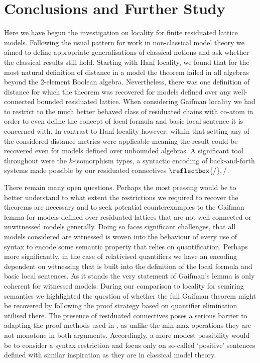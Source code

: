\documentclass{lmcs} %
\newcommand{\?}{\ensuremath{\mkern0.4\thinmuskip}}
\newcommand{\und}{\mathord{\reflectbox{/}}}%
\begin{document}

\section{Conclusions and Further Study}\label{Conclusion}
Here we have begun the investigation on locality for finite residuated lattice models. Following the usual pattern for work in non-classical model theory we aimed to define appropriate generalisations of classical notions and ask whether the classical results still hold. Starting with Hanf locality, we found that for the most natural definition of distance in a model the theorem failed in all algebras beyond the 2-element Boolean algebra. Nevertheless, there was one definition of distance for which the theorem was recovered for models defined over any well-connected bounded residuated lattice. When considering Gaifman locality we had to restrict to the much better behaved class of residuated chains with co-atom in order to even define the concept of local formula and basic local sentence it is concerned with. In contrast to Hanf locality however, within that setting any of the considered distance metrics were applicable meaning the result could be recovered even for models defined over unbounded algebras. A significant tool throughout were the $k$-isomorphism types, a syntactic encoding of back-and-forth systems made possible by our residuated connectives $\und,/$.

There remain many open questions. Perhaps the most pressing would be to better understand to what extent the restrictions we required to recover the theorems are necessary and to seek potential counterexamples to the Gaifman lemma for models defined over residuated lattices that are not well-connected or unwitnessed models generally. Doing so faces significant challenges, that all models considered are witnessed is woven into the behaviour of every use of syntax to encode some semantic property that relies on quantification. Perhaps more significantly, in the case of relativised quantifiers we have an encoding dependent on witnessing that is built into the definition of the local formula and basic local sentences. As it stands the very statement of Gaifman's lemma is only coherent for witnessed models. During our comparison to locality for semiring semantics we highlighted the question of whether the full Gaifman theorem might be recovered by following the proof strategy based on quantifier elimination utilised there. The presence of residuated connectives poses a serious barrier to adapting the proof methods used in \cite{BiziereGradelNaaf23:Localitysemiring}, as unlike the min-max operations they are not monotone in both arguments. Accordingly, a more modest possibility would be to consider a syntax restriction and focus only on so-called `positive' sentences defined with similar inspiration as they are in classical model theory. 
\end{document}

